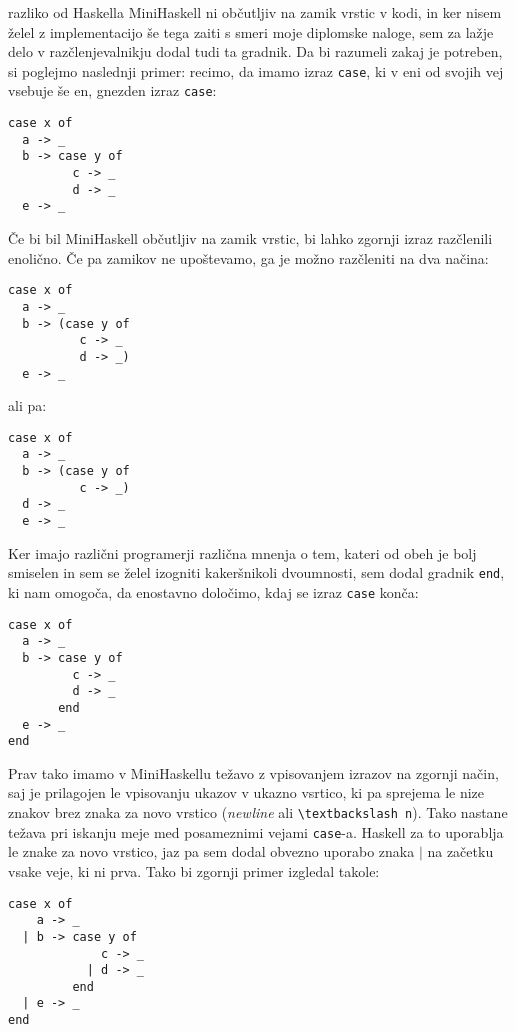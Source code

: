 \documentclass[12pt,a4paper,openany]{book}
\begin{document}
razliko od Haskella MiniHaskell ni občutljiv na zamik vrstic v kodi, in ker nisem želel z implementacijo še tega zaiti s smeri moje diplomske naloge, sem za lažje delo v razčlenjevalnikju 
dodal tudi ta gradnik. Da bi razumeli zakaj je potreben, si poglejmo naslednji primer: recimo, da imamo izraz \lstinline{case}, ki v eni od svojih vej vsebuje še en, gnezden izraz \lstinline{case}:
\begin{lstlisting}
case x of 
  a -> _
  b -> case y of
         c -> _
         d -> _
  e -> _
\end{lstlisting}
Če bi bil MiniHaskell občutljiv na zamik vrstic, bi lahko zgornji izraz razčlenili enolično. Če pa zamikov ne upoštevamo, ga je možno razčleniti na dva načina:
\begin{lstlisting}
case x of 
  a -> _
  b -> (case y of
          c -> _
          d -> _)
  e -> _
\end{lstlisting}
ali pa:
\begin{lstlisting}
case x of 
  a -> _
  b -> (case y of
          c -> _)
  d -> _
  e -> _
\end{lstlisting}
Ker imajo različni programerji različna mnenja o tem, kateri od obeh je bolj smiselen in sem se želel izogniti kakeršnikoli dvoumnosti, sem dodal 
gradnik \lstinline{end}, ki nam omogoča, da enostavno določimo, kdaj se izraz \lstinline{case} konča:
\begin{lstlisting}
case x of 
  a -> _
  b -> case y of
         c -> _
         d -> _
       end
  e -> _
end
\end{lstlisting}
Prav tako imamo v MiniHaskellu težavo z vpisovanjem izrazov na zgornji način, saj je prilagojen le vpisovanju ukazov v ukazno vsrtico, ki pa 
sprejema le nize znakov brez znaka za novo vrstico (\emph{newline} ali \lstinline{\textbackslash n}). Tako nastane težava pri iskanju meje med posameznimi vejami
\lstinline{case}-a. Haskell za to uporablja le znake za novo vrstico, jaz pa sem dodal obvezno uporabo znaka $\mid$ na začetku vsake veje, ki ni prva.
Tako bi zgornji primer izgledal takole:
\begin{lstlisting}
case x of 
    a -> _
  | b -> case y of
             c -> _
           | d -> _
         end
  | e -> _
end
\end{lstlisting}
\end{document}
